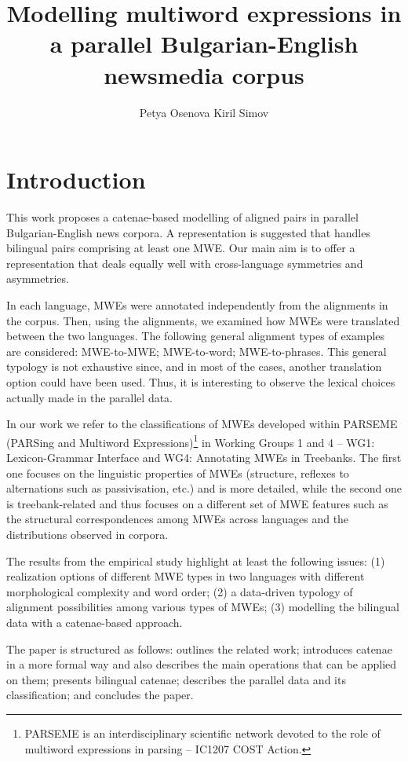 \documentclass[output=paper]{langsci/langscibook}
\author{Petya Osenova\affiliation{Linguistic Modelling Department, IICT-BAS}%
\lastand Kiril Simov\affiliation{Linguistic Modelling Department, IICT-BAS}}
\title{Modelling multiword expressions in a parallel Bulgarian-English newsmedia corpus}\shorttitlerunninghead{Modelling multiword expressions in a parallel Bulgarian-English corpus}
\begin{document}
\section{Introduction}

This work proposes a catenae-based modelling of aligned pairs in parallel \linebreak
Bulgarian-English news corpora. A representation is  suggested that  handles bilingual pairs
comprising at least one MWE. Our main aim is to offer a representation that
deals equally well with cross-language symmetries and asymmetries.

In each language, MWEs were annotated independently from the alignments in
the corpus. Then, using the alignments, we examined how MWEs were translated
between the two languages. The following general alignment types of examples
are considered: MWE-to-MWE; MWE-to-word; MWE-to-phrases. This general
typology is not exhaustive since, and in most of the cases, another translation
option could have been used. Thus, it is interesting to observe the lexical
choices actually made in the parallel data.

In our work we refer to the classifications of MWEs developed within \linebreak
PARSEME
(PARSing and Multiword Expressions)\footnote{PARSEME is an
interdisciplinary scientific network devoted to the role of multiword
expressions in parsing --  IC1207 COST Action.} in Working Groups 1 and 4 --
{WG1: Lexicon-Grammar Interface} and {WG4: Annotating MWEs in Treebanks}.
The first one focuses on the linguistic properties of MWEs (structure,
reflexes to alternations such as passivisation, etc.) and is more detailed,
while the second one is treebank-related and thus focuses on a different set
of MWE features such as the structural correspondences among MWEs across
languages and the distributions observed in corpora.

The results from the empirical study highlight at least the following
issues: (1) realization options of different MWE types in two languages with
different morphological complexity and word order; (2) a data-driven
typology of alignment possibilities among various types of MWEs; (3)
modelling the bilingual data with a catenae-based approach.

The paper is structured as follows:  outlines the related
work;  introduces catenae in a more formal way and also
describes the main operations that can be applied on them;   presents
bilingual catenae;   describes the parallel data and its
classification; and   concludes the paper.
\end{document}
